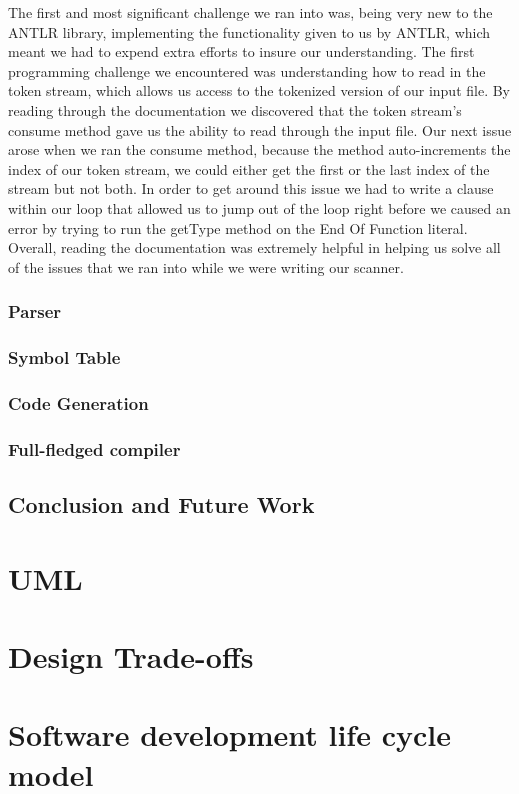 \documentclass[sigconf]{acmart}
\begin{document}
\newline
The first and most significant challenge we ran into was, being very new to the ANTLR library, implementing the functionality given to us by ANTLR, which meant we had to expend extra efforts to insure our understanding. The first programming challenge we encountered was understanding how to read in the token stream, which allows us access to the tokenized version of our input file. By reading through the documentation we discovered that the token stream's consume method gave us the ability to read through the input file. Our next issue arose when we ran the consume method, because the method auto-increments the index of our token stream, we could either get the first or the last index of the stream but not both. In order to get around this issue we had to write a clause within our loop that allowed us to jump out of the loop right before we caused an error by trying to run the getType method on the End Of Function literal. Overall, reading the documentation was extremely helpful in helping us solve all of the issues that we ran into while we were writing our scanner.

\subsubsection{Parser} 
\subsubsection{Symbol Table} 
\subsubsection{Code Generation} 
\subsubsection{Full-fledged compiler}

\subsection{Conclusion and Future Work}

\section{UML}
\section{Design Trade-offs}
\section{Software development life cycle model}
\end{document}
